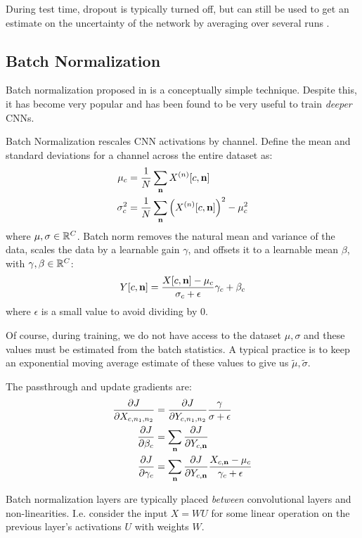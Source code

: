 During test time, dropout is typically turned off, but can still be
used to get an estimate on the uncertainty of the network by averaging over
several runs \cite{gal_dropout_2016}.

\subsection{Batch Normalization}
Batch normalization proposed in \cite{ioffe_batch_2015} is a conceptually 
simple technique. Despite this, it has become very popular and has been found
to be very useful to train \emph{deeper} CNNs. 

Batch Normalization rescales CNN activations by channel. Define the mean
and standard deviations for a channel across the entire dataset as:
\begin{align}
  \mu_c &= \frac{1}{N} \sum_\nn X^{(n)}[c, \nn] \\
  \sigma_c^2 &=  \frac{1}{N} \sum_\nn \left(X^{(n)}[c, \nn]\right)^2 - \mu^2_c 
\end{align}
where $\mu, \sigma \in \reals[C]$.
Batch norm removes the natural mean and variance of the data, scales the data
by a learnable gain $\gamma$, and offsets it to a learnable mean $\beta$,
with $\gamma, \beta \in \reals[C]$:
\begin{equation}
  Y[c, \nn] = \frac{X[c, \nn] - \mu_c}{\sigma_c + \epsilon}\gamma_c + \beta_c
\end{equation}
where $\epsilon$ is a small value to avoid dividing by 0.

Of course, during training, we do not have access to the dataset $\mu, \sigma$
and these values must be estimated from the batch statistics. A typical practice
is to keep an exponential moving average estimate of these values to give us
$\tilde{\mu}, \tilde{\sigma}$. 

The passthrough and update gradients are:
\begin{align}
  \dydx{J}{X_{c, n_1, n_2}} &= \dydx{J}{Y_{c, n_1, n_2}}\frac{\gamma}{\sigma + \epsilon}\\
  \dydx{J}{\beta_c} &=  \sum_\nn \dydx{J}{Y_{c, \nn}}\\
  \dydx{J}{\gamma_c} &= \sum_\nn \dydx{J}{Y_{c, \nn}}\frac{X_{c, \nn} - \mu_c}{\gamma_c + \epsilon}
\end{align}

Batch normalization layers are typically placed \emph{between} convolutional layers
and non-linearities. I.e. consider the input $X=WU$ for some linear operation
on the previous layer's activations $U$ with weights $W$.

